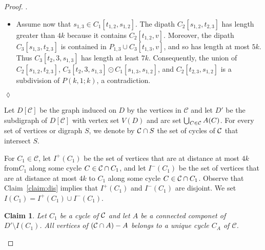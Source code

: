 \documentclass[utf8,10pt]{article}
\theoremstyle{plain}
\newtheorem{claim}{Claim}[theorem]
\theoremstyle{definition}
\theoremstyle{remark}
\newenvironment{subproof}{\par\noindent {\it Subproof}.\ }{\hfill$\lozenge$\par\vspace{11pt}}
\begin{document}
\begin{proof}
\begin{subproof}
\begin{itemize}
	\item Assume now that $s_{1,3}\in C_1[t_{1,2},s_{1,2}]$. The dipath  $C_2[s_{1,2}, t_{2,3}]$ has length greater than $4k$ because it contains $C_2[t_{1,2},v]$. Moreover, the dipath $C_3[s_{1,3}, t_{2,3}]$ is contained in $P_{1,3}\cup C_3[t_{1,3},v]$, and so has length at most $5k$.
	Thus $C_3[t_2,3, s_{1,3}]$ has length at least $7k$.
	 Consequently, the union of $C_2[s_{1,2}, t_{2,3}]$, $C_3[t_2,3, s_{1,3}]\odot C_1[s_{1,3}, s_{1,2}]$, and $C_2[t_{2,3}, s_{1,2}]$ is a subdivision of $P(k,1;k)$, a contradiction.
\end{itemize}
\end{subproof}
 
 
 
 
 
 
 Let $D[\mathcal{C}]$ be the graph induced on $D$ by the vertices in $\mathcal{C}$ and let $D'$ be the subdigraph of $D[\mathcal{C}]$ with vertex set $V(D)$ and arc set  $\bigcup_{C\in {\cal C}} A(C)$.
For every set of vertices or digraph $S$, we denote by ${\cal C}\cap S$ the set of cycles of ${\cal C}$ that intersect $S$. 



For $C_1\in \mathcal{C}$, let $I^+(C_1)$ be the set of vertices that are at distance at most $4k$
from$C_1$ along some cycle $C\in {\cal C}\cap C_1$, and let $I^-(C_1)$ be the set of vertices that are at distance at most $4k$ to $C_1$ along some cycle $C\in {\cal C}\cap C_1$.
Observe that Claim~\ref{claim:dis} implies that $I^+(C_1)$ and $I^-(C_1)$ are disjoint. We set $I(C_1)=I^+(C_1)\cup I^-(C_1)$.




\begin{claim}\label{claim:A}
Let $C_1$ be a cycle of ${\cal C}$ and let $A$ be a connected componet of $D'\setminus I(C_1)$.
All vertices of $({\cal C}\cap A)  - A$ belongs to a unique cycle $C_A$ of $\mathcal{C}$.
\end{claim}


\end{proof}
\end{document}
